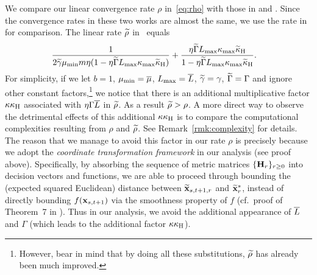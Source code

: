 \documentclass[10pt,twocolumn,journal]{IEEEtran}
\begin{document}
\begin{remark}\label{rmk:main}
We compare our linear convergence rate $\rho$ in~\eqref{eq:rho}  with those in \cite{Moritz_16} and \cite{Gower_16}. Since the convergence rates in these two works are almost the same, %
we use the rate in \cite{Moritz_16} for comparison. The linear rate $\widetilde{\rho}$ in~\cite{Moritz_16} equals %
\begin{align}
&\frac{1}{2\tgamma\mu_{\min}m\eta(1-\eta\tGamma L_{\max}\kappa_{\max}\tkappa_{\rmH})} + \frac{\eta\tGamma L_{\max}\kappa_{\max}\tkappa_{\rmH}}{1-\eta\tGamma L_{\max}\kappa_{\max}\tkappa_{\rmH}}.\nn%
\end{align}
For simplicity, if we let $b=1$, $\mu_{\min}=\overline{\mu}$, $L_{\max} = \overline{L}$, $\widetilde{\gamma}=\gamma$, $\widetilde{\Gamma} = \Gamma$ and ignore other constant factors,\footnote{However, bear in mind that by doing all these substitutions, $\widetilde{\rho}$ has already been much improved.} we notice that there is an additional multiplicative factor $\kappa\kappa_{\mathrm{H}}$ associated with $\eta\Gamma\overline{L}$ in $\widetilde{\rho}$. %
As a result $\widetilde{\rho}>\rho$. %
A more direct way to observe the detrimental effects of this additional $\kappa\kappa_{\mathrm{H}}$ is to compare the computational complexities resulting from $\rho$ and $\widetilde{\rho}$. See Remark~\ref{rmk:complexity} for details.  %
The reason that we manage to avoid this factor in our rate $\rho$ is precisely because we adopt the {\em coordinate transformation framework} in our analysis (see proof above). Specifically, by absorbing the sequence of metric matrices $\{\mathbf{H}_r\}_{r\ge 0}$ into decision vectors and functions, we are able to proceed through bounding the (expected squared Euclidean) distance between $\widetilde{\mathbf{x}}_{s,t+1,r}$ and $\widetilde{\mathbf{x}}_r^*$, instead of directly bounding $f(\mathbf{x}_{s,t+1})$ via the smoothness property of $f$ (cf.~proof of Theorem~7 in \cite{Moritz_16}). Thus in our analysis, we avoid the additional appearance of $\overline{L}$ and $\Gamma$ (which leads to the additional factor $\kappa\kappa_{\mathrm{H}}$). 
\end{remark}
\end{document}
